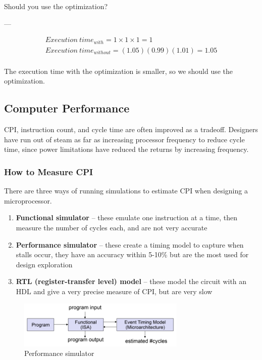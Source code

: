 \documentclass{article}
\begin{document}
Should you use the optimization?

---

$$
\begin{matrix}
Execution\ time_{with} = 1 \times 1 \times 1 = 1 \\ 
Execution\ time_{without} = (1.05)(0.99)(1.01) = 1.05 \\ 
\end{matrix}
$$

The execution time with the optimization is smaller, so we should use the optimization.

\subsection{Computer Performance}

CPI, instruction count, and cycle time are often improved as a tradeoff. Designers have run out of steam as far as increasing processor frequency to reduce cycle time, since power limitations have reduced the returns by increasing frequency.

\subsubsection{How to Measure CPI}

There are three ways of running simulations to estimate CPI when designing a microprocessor. 

\begin{enumerate}
\item \textbf{Functional simulator} -- these emulate one instruction at a time, then measure the number of cycles each, and are not very accurate
\item \textbf{Performance simulator} -- these create a timing model to capture when stalls occur, they have an accuracy within 5-10\% but are the most used for design exploration
\item \textbf{RTL (register-transfer level) model} -- these model the circuit with an HDL and give a very precise measure of CPI, but are very slow
\end{enumerate}

\begin{figure}[ht!]
\centering
\includegraphics[width=80mm]{img/PerformanceSimulator.png}
\caption{Performance simulator}
\end{figure}
\end{document}
